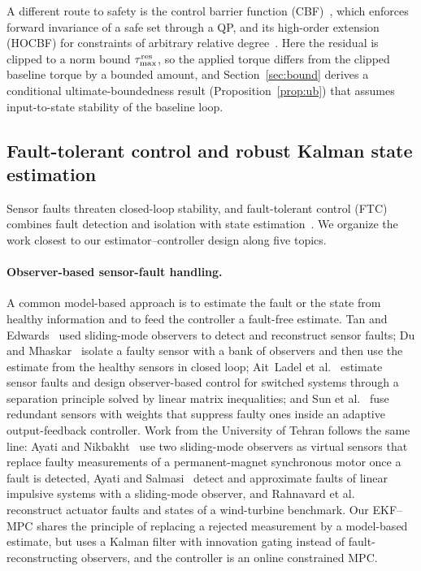 \documentclass[preprint,12pt,authoryear=false]{elsarticle}
\theoremstyle{remark}\newtheorem{remark}{Remark}
\theoremstyle{plain}\newtheorem{proposition}{Proposition}\newtheorem{lemma}{Lemma}
\theoremstyle{definition}\newtheorem{assumption}{Assumption}
\begin{document}
A different route to safety is the control barrier function (CBF)~\cite{ames2019control}, which enforces forward invariance of a safe set through a QP, and its high-order extension (HOCBF) for constraints of arbitrary relative degree~\cite{xiao2022high}. Here the residual is clipped to a norm bound $\tau^{\rm res}_{\max}$, so the applied torque differs from the clipped baseline torque by a bounded amount, and Section~\ref{sec:bound} derives a conditional ultimate-boundedness result (Proposition~\ref{prop:ub}) that assumes input-to-state stability of the baseline loop.

\subsection{Fault-tolerant control and robust Kalman state estimation}
Sensor faults threaten closed-loop stability, and fault-tolerant control (FTC) combines fault detection and isolation with state estimation~\cite{blanke2016diagnosis,isermann2011fault,patton2000fault}. We organize the work closest to our estimator--controller design along five topics.

\paragraph{Observer-based sensor-fault handling.}
A common model-based approach is to estimate the fault or the state from healthy information and to feed the controller a fault-free estimate. Tan and Edwards~\cite{tan2002sliding} used sliding-mode observers to detect and reconstruct sensor faults; Du and Mhaskar~\cite{du2014isolation} isolate a faulty sensor with a bank of observers and then use the estimate from the healthy sensors in closed loop; Ait~Ladel et al.~\cite{ailadel2021integrated} estimate sensor faults and design observer-based control for switched systems through a separation principle solved by linear matrix inequalities; and Sun et al.~\cite{sun2025adaptive} fuse redundant sensors with weights that suppress faulty ones inside an adaptive output-feedback controller. Work from the University of Tehran follows the same line: Ayati and Nikbakht~\cite{ayati2016pmsm} use two sliding-mode observers as virtual sensors that replace faulty measurements of a permanent-magnet synchronous motor once a fault is detected, Ayati and Salmasi~\cite{ayati2015fault} detect and approximate faults of linear impulsive systems with a sliding-mode observer, and Rahnavard et al.~\cite{rahnavard2017sliding,rahnavard2019finite} reconstruct actuator faults and states of a wind-turbine benchmark. Our EKF--MPC shares the principle of replacing a rejected measurement by a model-based estimate, but uses a Kalman filter with innovation gating instead of fault-reconstructing observers, and the controller is an online constrained MPC.
\end{document}
